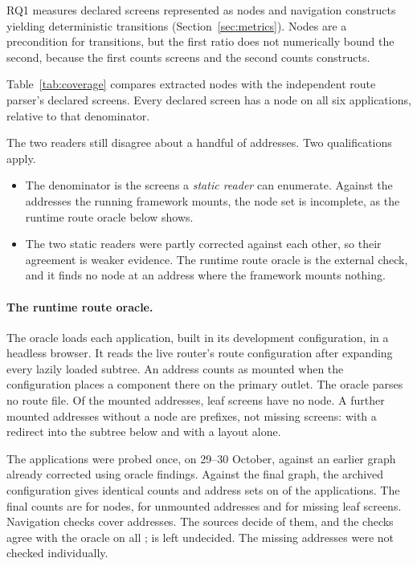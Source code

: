 RQ1 measures declared screens represented as nodes and navigation constructs yielding deterministic
transitions (Section~\ref{sec:metrics}). Nodes are a precondition for transitions, but the first
ratio does not numerically bound the second, because the first counts screens and the second counts constructs.

Table~\ref{tab:coverage} compares extracted nodes with the independent route parser's declared
screens. Every declared screen has a node on all six applications, relative to that denominator.

The two readers still disagree about a handful of addresses. Two qualifications apply.

\begin{itemize}
\item The denominator is the screens a \emph{static reader} can enumerate. Against the addresses
the running framework mounts, the node set is incomplete, as the runtime route oracle below shows.
\item The two static readers were partly corrected against each other, so their agreement is weaker evidence. The runtime route oracle is the external
check, and it finds no node at an address where the framework mounts nothing.
\end{itemize}

\paragraph{The runtime route oracle.}\label{sec:res-probe} The oracle loads each application,
built in its development configuration, in a headless browser. It reads the live router's route
configuration after expanding every lazily loaded subtree. An address counts as mounted when the
configuration places a component there on the primary outlet. The oracle parses no route file. Of the
\ProbeScreens{} mounted addresses, \ProbeMissed{} leaf screens have no node. A further \ProbeMissedPrefixOnly{} mounted addresses
without a node are prefixes, not missing screens: \ProbeMissedPrefixRedirect{} with a redirect
into the subtree below and \ProbeMissedPrefixUnanswered{} with a layout alone.

The applications were probed once, on 29--30 October, against an earlier graph already corrected
using oracle findings. Against the final graph, the archived configuration gives identical counts
and address sets on \ProbeFinalSame{} of the \ProbeFinalApps{} applications. The final counts are
\ProbeFinalNodes{} for nodes, \ProbeFinalInvented{} for unmounted addresses and
\ProbeFinalMissed{} for missing leaf screens. Navigation checks cover \ProbeAnswerAddresses{} addresses.
The sources decide \ProbeAnswerChecked{} of them, and the checks agree with the oracle on all
\ProbeAnswerAgreed{}; \ProbeAnswerUndecided{} is left undecided. The \ProbeMissed{} missing addresses were
not checked individually.


